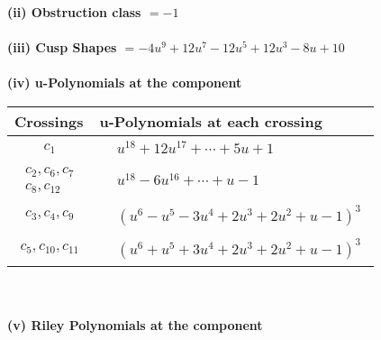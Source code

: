\documentclass[1p]{elsarticle_modified}
\theoremstyle{definition}
\begin{document}
\flushleft \textbf{(ii) Obstruction class $= -1$}\\~\\
\flushleft \textbf{(iii) Cusp Shapes $= -4 u^9+12 u^7-12 u^5+12 u^3-8 u+10$}\\~\\
\newpage\renewcommand{\arraystretch}{1}
\flushleft \textbf{(iv) u-Polynomials at the component}\newline \\
\begin{tabular}{m{50pt}|m{274pt}}
Crossings & \hspace{64pt}u-Polynomials at each crossing \\
\hline $$\begin{aligned}c_{1}\end{aligned}$$&$\begin{aligned}
&u^{18}+12 u^{17}+\cdots+5 u+1
\end{aligned}$\\
\hline $$\begin{aligned}c_{2},c_{6},c_{7}\\c_{8},c_{12}\end{aligned}$$&$\begin{aligned}
&u^{18}-6 u^{16}+\cdots+u-1
\end{aligned}$\\
\hline $$\begin{aligned}c_{3},c_{4},c_{9}\end{aligned}$$&$\begin{aligned}
&(u^6- u^5-3 u^4+2 u^3+2 u^2+u-1)^3
\end{aligned}$\\
\hline $$\begin{aligned}c_{5},c_{10},c_{11}\end{aligned}$$&$\begin{aligned}
&(u^6+u^5+3 u^4+2 u^3+2 u^2+u-1)^3
\end{aligned}$\\
\hline
\end{tabular}\\~\\
\newpage\renewcommand{\arraystretch}{1}
\flushleft \textbf{(v) Riley Polynomials at the component}\newline \\
\end{document}
